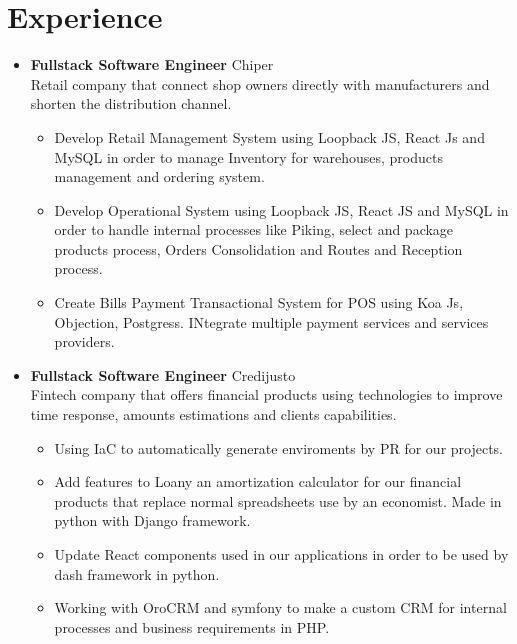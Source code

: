 \documentclass[]{friggeri-cv}
\renewenvironment{entrylist}{%
  \begin{itemize}[leftmargin=0.9in]%
}{%
  \end{itemize}
}
\renewcommand{\entry}[4]{%
  \item[#1] 
    \textbf{#2}%
    \hfill%
    {\footnotesize\addfontfeature{Color=pblue} #3 }\\%
    #4\vspace{\parsep}%
  }
\begin{document}
\section{Experience}
\begin{entrylist}
  \entry	
    {09/19 - Present}
    {Fullstack Software Engineer}
    {Chiper}
    {Retail company that connect shop owners directly with manufacturers and shorten the distribution channel.\\\vspace{-3mm}
    \begin{itemize}[label=$•$]
    \addtolength{\itemindent}{-4mm}
    	\item Develop Retail Management System using Loopback JS, React Js and MySQL in order to manage Inventory for warehouses, products management and ordering system.\vspace{1mm}
    	\item Develop Operational System using Loopback JS, React JS and MySQL in order to handle internal processes like Piking, select and package products process, Orders Consolidation and Routes and Reception process.\vspace{1mm}
    	\item Create Bills  Payment Transactional System for POS using Koa Js, Objection, Postgress. INtegrate multiple payment services and services providers.\vspace{1mm}
	\end{itemize}
    } 
  \entry	
    {03/19 - 09/19}
    {Fullstack Software Engineer}
    {Credijusto}
    {Fintech company that offers financial products using technologies to improve time response, amounts estimations and clients capabilities.\\\vspace{-3mm}
    \begin{itemize}[label=$•$]
    \addtolength{\itemindent}{-4mm}
    	\item Using IaC to automatically generate enviroments by PR for our projects.\vspace{1mm}
    	\item  Add features to Loany an amortization calculator for our financial products that replace normal spreadsheets use by an economist. Made in python with Django framework.\vspace{1mm}
    	\item Update React components used in our applications in order to be used by dash framework in python.\vspace{1mm}
    	\item Working with OroCRM and symfony to make a custom CRM for internal processes and business requirements in PHP.\vspace{1mm}

\end{itemize}}
\end{entrylist}
\end{document}
